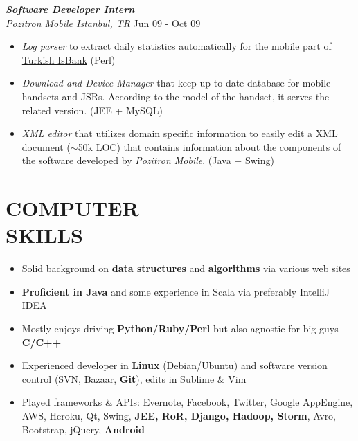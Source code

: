 \documentclass[line, margin]{res}
\begin{document}
\begin{resume}
	{\sl \textbf{Software Developer Intern} \\ \href{http://www.pozitron.com/}{Pozitron Mobile} Istanbul, TR} \hfill Jun 09 - Oct 09\\
	\vspace{-0.3cm}
	\begin{itemize} \itemsep -2pt
		\item \textit{Log parser} to extract daily statistics automatically for the mobile part of \href{http://www.isbank.com.tr/English/}{Turkish IsBank} (Perl)
		\item \textit{Download and Device Manager} that keep up-to-date database for mobile handsets  and JSRs. According to the model of the handset, it serves the related version. (JEE + MySQL)
		\item \textit{XML editor} that utilizes domain specific information to easily edit a XML document ($\sim$50k LOC) that contains information about the components of the software developed by \textit{Pozitron Mobile}. (Java + Swing)
	\end{itemize}

\section{COMPUTER \\ SKILLS} 
	\begin{itemize}
		\item Solid background on \textbf{data structures} and \textbf{algorithms} via various web sites
		\item \textbf{Proficient in Java} and some experience in Scala via preferably IntelliJ IDEA
		\item Mostly enjoys driving \textbf{Python/Ruby/Perl} but also agnostic for big guys \textbf{C/C++}
		\item Experienced developer in \textbf{Linux} (Debian/Ubuntu) and software version control (SVN, Bazaar, \textbf{Git}), edits in Sublime \& Vim
		\item Played frameworks \& APIs: Evernote, Facebook, Twitter, Google AppEngine, AWS, Heroku, Qt, Swing,  \textbf{JEE, RoR, Django, Hadoop, Storm}, Avro, Bootstrap, jQuery, \textbf{Android}
	\end{itemize}
\end{resume}
\end{document}
